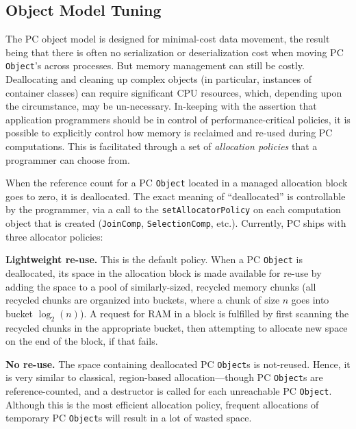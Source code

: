 \subsection{Object Model Tuning}
\label{sec:allocation}

\noindent
The PC object model is designed for minimal-cost data movement, the result being that there is often no serialization or deserialization
cost
when moving PC \texttt{Object}'s across processes.  But memory management can still be costly.  Deallocating and cleaning
up complex objects (in particular, instances of container classes) can require significant CPU resources, which, depending upon the 
circumstance, may be un-necessary.  In-keeping with the assertion that application programmers should be in
control of performance-critical policies, it is possible to explicitly control how memory is reclaimed and re-used during PC computations.
This is facilitated through a set of \emph{allocation policies} that a programmer can choose from.

When the reference count for a PC \texttt{Object} located in a managed allocation block goes to zero, it is deallocated.  The exact
meaning of ``deallocated'' is controllable by the programmer, via a call to the \texttt{setAllocatorPolicy} on each computation object
that is created (\texttt{JoinComp}, \texttt{SelectionComp}, etc.).  Currently, PC ships with
three allocator policies:

\vspace{5pt}
\noindent
\textbf{Lightweight re-use.}  This is the default policy.  When a PC \texttt{Object} is deallocated, its space in the allocation block is made available for re-use by
adding the space to a pool of similarly-sized, recycled memory chunks (all recycled chunks are organized into buckets, where a chunk of size
$n$ goes into bucket $\log_2 (n)$).  A request for RAM in a block is fulfilled by first scanning the recycled chunks in the appropriate bucket, then
attempting to allocate new space on the end of the block, if that fails.

\vspace{5pt}
\noindent
\textbf{No re-use.}  The space containing deallocated PC \texttt{Object}s is not-reused.  Hence, it is very similar to classical, region-based allocation---though PC \texttt{Object}s
are reference-counted, and a destructor is called for each unreachable PC \texttt{Object}.
Although this is the most efficient allocation policy, frequent allocations of temporary PC \texttt{Object}s will result in a lot of wasted space.

